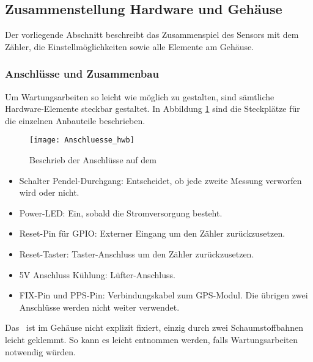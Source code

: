 \subsection{Zusammenstellung Hardware und Gehäuse}
\label{cap:housing}
Der vorliegende Abschnitt beschreibt das Zusammenspiel des Sensors mit dem Zähler, die Einstellmöglichkeiten sowie alle Elemente am Gehäuse.
\subsubsection{Anschlüsse und Zusammenbau}
Um Wartungsarbeiten so leicht wie möglich zu gestalten, sind sämtliche Hardware-Elemente steckbar gestaltet. In Abbildung \ref{fig:Anschluesse_hwb} sind die Steckplätze für die einzelnen Anbauteile beschrieben.
\begin{figure}[H]
	\centering
	\texttt{[image: Anschluesse\_hwb]}
	\caption{Beschrieb der Anschlüsse auf dem \hwb}
	\label{fig:Anschluesse_hwb}
\end{figure}
\begin{itemize}
	\item Schalter Pendel-Durchgang: Entscheidet, ob jede zweite Messung verworfen wird oder nicht.
	\item Power-LED: Ein, sobald die Stromversorgung besteht.
	\item Reset-Pin für GPIO: Externer Eingang um den Zähler zurückzusetzen.
	\item Reset-Taster: Taster-Anschluss um den Zähler zurückzusetzen.
	\item 5V Anschluss Kühlung: Lüfter-Anschluss.
	\item FIX-Pin und PPS-Pin: Verbindungskabel zum GPS-Modul. Die übrigen zwei Anschlüsse werden nicht weiter verwendet.
\end{itemize}
Das \hwb\ ist im Gehäuse nicht explizit fixiert, einzig durch zwei Schaumstoffbahnen leicht geklemmt. So kann es leicht entnommen werden, falls Wartungsarbeiten notwendig würden.
